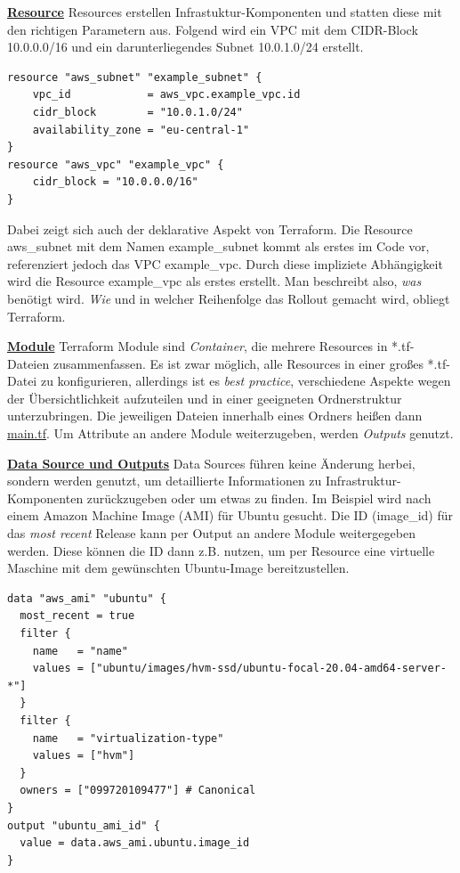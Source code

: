 \textbf{\underline{Resource}}
Resources erstellen Infrastuktur-Komponenten und statten diese mit den richtigen Parametern aus. Folgend wird ein VPC mit dem CIDR-Block 10.0.0.0/16 und ein darunterliegendes Subnet 10.0.1.0/24 erstellt.

\begin{verbatim}
resource "aws_subnet" "example_subnet" {
    vpc_id            = aws_vpc.example_vpc.id
    cidr_block        = "10.0.1.0/24"
    availability_zone = "eu-central-1"
}
resource "aws_vpc" "example_vpc" {
    cidr_block = "10.0.0.0/16"
}
\end{verbatim}

Dabei zeigt sich auch der deklarative Aspekt von Terraform. Die Resource \glqq aws_subnet\grqq{} mit dem Namen \glqq example_subnet\grqq{} kommt als erstes im Code vor, referenziert jedoch das VPC \glqq example_vpc\grqq{}. Durch diese impliziete Abhängigkeit wird die Resource \glqq example_vpc\grqq{} als erstes erstellt. Man beschreibt also, \textit{was} benötigt wird. \textit{Wie} und in welcher Reihenfolge das Rollout gemacht wird, obliegt Terraform.

\textbf{\underline{Module}}
Terraform Module sind \textit{Container}, die mehrere Resources in *.tf-Dateien zusammenfassen. Es ist zwar möglich, alle Resources in einer großes *.tf-Datei zu konfigurieren, allerdings ist es \textit{best practice}, verschiedene Aspekte wegen der Übersichtlichkeit aufzuteilen und in einer geeigneten Ordnerstruktur unterzubringen. Die jeweiligen Dateien innerhalb eines Ordners heißen dann \underline{main.tf}. Um Attribute an andere Module weiterzugeben, werden \textit{Outputs} genutzt. 

\textbf{\underline{Data Source und Outputs}}
Data Sources führen keine Änderung herbei, sondern werden genutzt, um detaillierte Informationen zu Infrastruktur-Komponenten zurückzugeben oder um etwas zu finden. Im Beispiel wird nach einem Amazon Machine Image (AMI) für Ubuntu gesucht. Die ID (image\_id) für das \textit{most recent} Release kann per Output an andere Module weitergegeben werden. Diese können die ID dann z.B. nutzen, um per Resource eine virtuelle Maschine mit dem gewünschten Ubuntu-Image bereitzustellen.

\begin{verbatim}
data "aws_ami" "ubuntu" {
  most_recent = true
  filter {
    name   = "name"
    values = ["ubuntu/images/hvm-ssd/ubuntu-focal-20.04-amd64-server-*"]
  }
  filter {
    name   = "virtualization-type"
    values = ["hvm"]
  }
  owners = ["099720109477"] # Canonical
}
output "ubuntu_ami_id" {
  value = data.aws_ami.ubuntu.image_id
}
\end{verbatim}

